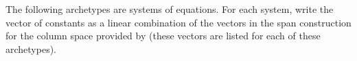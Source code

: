 The following archetypes are systems of equations.  For each system, write the vector of constants as a linear combination of the vectors in the span construction for the column space provided by  (these vectors are listed for each of these archetypes).\\
\\ 
\\ 
\\ 
\\
\\ 
\\ 
\\
\\ 
\\


